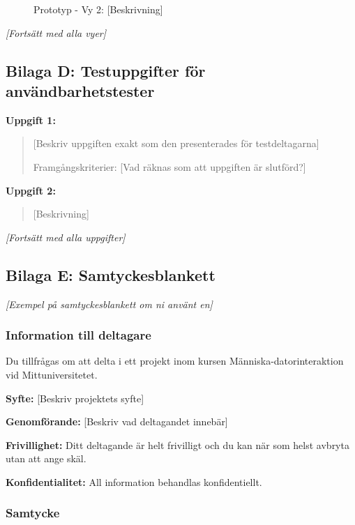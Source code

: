 \begin{figure}[h]
    \centering
    \caption{Prototyp - Vy 2: [Beskrivning]}
\end{figure}

\textit{[Fortsätt med alla vyer]}


\subsection{Bilaga D: Testuppgifter för användbarhetstester}

\textbf{Uppgift 1:}
\begin{quote}
[Beskriv uppgiften exakt som den presenterades för testdeltagarna]

Framgångskriterier: [Vad räknas som att uppgiften är slutförd?]
\end{quote}

\textbf{Uppgift 2:}
\begin{quote}
[Beskrivning]
\end{quote}

\textit{[Fortsätt med alla uppgifter]}


\subsection{Bilaga E: Samtyckesblankett}

\textit{[Exempel på samtyckesblankett om ni använt en]}

\subsubsection{Information till deltagare}

Du tillfrågas om att delta i ett projekt inom kursen Människa-datorinteraktion vid Mittuniversitetet.

\textbf{Syfte:} [Beskriv projektets syfte]

\textbf{Genomförande:} [Beskriv vad deltagandet innebär]

\textbf{Frivillighet:} Ditt deltagande är helt frivilligt och du kan när som helst avbryta utan att ange skäl.

\textbf{Konfidentialitet:} All information behandlas konfidentiellt.

\subsubsection{Samtycke}

